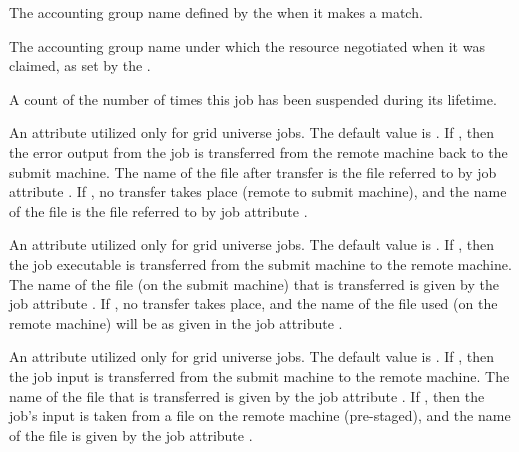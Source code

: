 \begin{description}
\item[\AdAttr{SubmitterGroup}:]  The accounting group name defined
by the  when it makes a match. 

\item[\AdAttr{SubmitterNegotiatingGroup}:]  The accounting group name under
which the resource negotiated when it was claimed, 
as set by the . 
 
\item[\AdAttr{TotalSuspensions}:]  A count of the number of times this job
has been suspended during its lifetime.

\item[\AdAttr{TransferErr}:]   
An attribute utilized only for grid universe jobs.
The default value is .
If , then the error output from the job
is transferred from the remote machine back to the submit machine.
The name of the file after transfer is the file referred to
by job attribute .
If , no transfer takes place (remote to submit machine),
and the name of the file is the file referred to
by job attribute .

\item[\AdAttr{TransferExecutable}:]   
An attribute utilized only for grid universe jobs.
The default value is .
If , then the job executable is transferred from the submit
machine to the remote machine.
The name of the file (on the submit machine)
that is transferred is given by the
job attribute .
If , no transfer takes place, and
the name of the file used (on the remote machine) will be as
given in the job attribute .

\item[\AdAttr{TransferIn}:]   
An attribute utilized only for grid universe jobs.
The default value is .
If , then the job input is transferred from the submit
machine to the remote machine.
The name of the file that is transferred is given by the
job attribute .
If , then the job's input is taken from a file on the
remote machine (pre-staged), and 
the name of the file is given by the job attribute .


\end{description}
